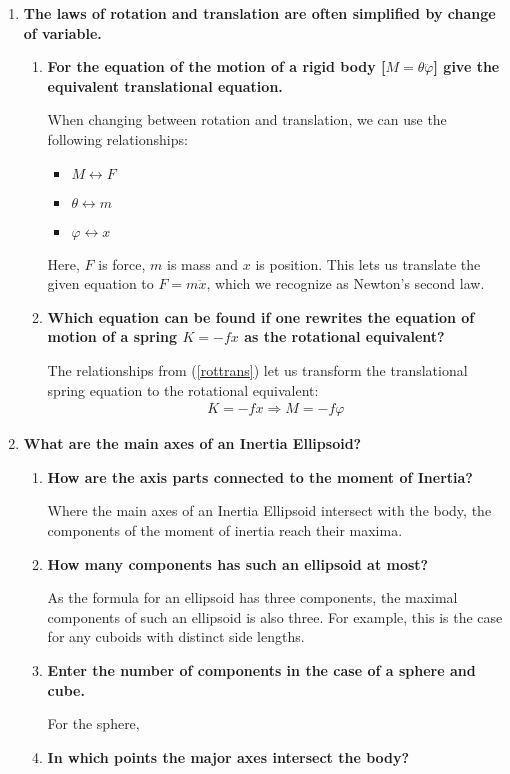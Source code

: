 \begin{enumerate}
\begin{enumerate}
	\end{enumerate}
	\item
	\textbf{The laws of rotation and translation are often simplified by change of variable.}
	\begin{enumerate}
		\item 
		\textbf{For the equation of the motion of a rigid body [$M = \theta \ddot{\varphi}$] give the equivalent translational equation.}
		
		When changing between rotation and translation, we can use the following relationships:
		\begin{itemize}
			\label{rottrans}
			\item $M \leftrightarrow F$
			\item $\theta \leftrightarrow m$
			\item $\varphi \leftrightarrow x$
		\end{itemize}
		Here, $F$ is force, $m$ is mass and $x$ is position.
		This lets us translate the given equation to $F = m \ddot{x}$, which we recognize as Newton's second law.
		\item
		\textbf{Which equation can be found if one rewrites the equation of motion of a spring $K = -fx$ as the rotational equivalent?}
		
		The relationships from (\ref{rottrans}) let us transform the translational spring equation to the rotational equivalent:
		\begin{align*}
			K = -fx \Longrightarrow M = -f \varphi
		\end{align*}
		
	\end{enumerate}
	\item
	\textbf{What are the main axes of an Inertia Ellipsoid?}

	\begin{enumerate}
		\item 
		\textbf{How are the axis parts connected to the moment of Inertia?}
		
		Where the main axes of an Inertia Ellipsoid intersect with the body, the components of the moment of inertia reach their maxima.
		
		\item
		\textbf{How many components has such an ellipsoid at most?}
		
		As the formula for an ellipsoid has three components, the maximal components of such an ellipsoid is also three.
		For example, this is the case for any cuboids with distinct side lengths.
		
		\item
		\textbf{Enter the number of components in the case of a sphere and cube.}
		
		For the sphere, 
		
		\item
		\textbf{In which points the major axes intersect the body?}
	\end{enumerate}
	
\end{enumerate}